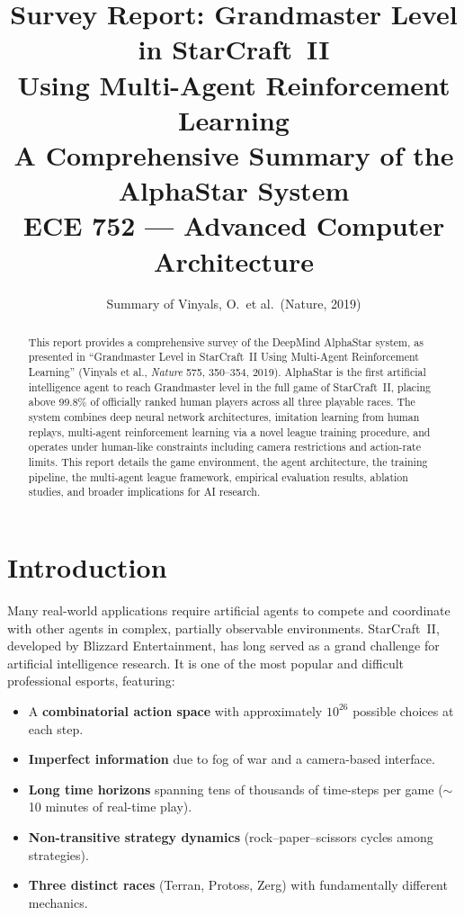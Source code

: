 \documentclass[11pt,a4paper]{article}
\title{\textbf{Survey Report: Grandmaster Level in StarCraft~II\\Using Multi-Agent Reinforcement Learning}\\[0.5em]
\large A Comprehensive Summary of the AlphaStar System\\[0.3em]
\normalsize ECE 752 --- Advanced Computer Architecture}
\author{Summary of Vinyals, O.\ et al.\ (Nature, 2019)}
\date{}
\begin{document}
\maketitle

\begin{abstract}
This report provides a comprehensive survey of the DeepMind AlphaStar system, as presented in ``Grandmaster Level in StarCraft~II Using Multi-Agent Reinforcement Learning'' (Vinyals et al., \textit{Nature} 575, 350--354, 2019). AlphaStar is the first artificial intelligence agent to reach Grandmaster level in the full game of StarCraft~II, placing above 99.8\% of officially ranked human players across all three playable races. The system combines deep neural network architectures, imitation learning from human replays, multi-agent reinforcement learning via a novel league training procedure, and operates under human-like constraints including camera restrictions and action-rate limits. This report details the game environment, the agent architecture, the training pipeline, the multi-agent league framework, empirical evaluation results, ablation studies, and broader implications for AI research.
\end{abstract}

\tableofcontents
\newpage

\section{Introduction}

Many real-world applications require artificial agents to compete and coordinate with other agents in complex, partially observable environments. StarCraft~II, developed by Blizzard Entertainment, has long served as a grand challenge for artificial intelligence research. It is one of the most popular and difficult professional esports, featuring:

\begin{itemize}[nosep]
    \item A \textbf{combinatorial action space} with approximately $10^{26}$ possible choices at each step.
    \item \textbf{Imperfect information} due to fog of war and a camera-based interface.
    \item \textbf{Long time horizons} spanning tens of thousands of time-steps per game ($\sim$10 minutes of real-time play).
    \item \textbf{Non-transitive strategy dynamics} (rock--paper--scissors cycles among strategies).
    \item \textbf{Three distinct races} (Terran, Protoss, Zerg) with fundamentally different mechanics.
\end{itemize}
\end{document}
